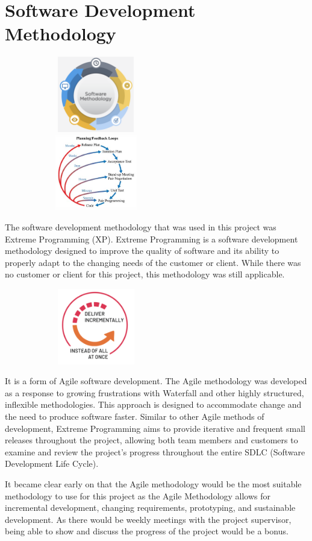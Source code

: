 \section{Software Development Methodology}
\begin{center}
    \includegraphics[width=8cm,height=3.3cm,keepaspectratio]{images/software_methodology}
    \includegraphics[width=8cm,height=3.3cm,keepaspectratio]{images/xp}
\end{center}
\par
The software development methodology that was used in this project was Extreme 
Programming (XP). Extreme Programming is a software development methodology 
designed to improve the quality of software and its ability to properly adapt to
the changing needs of the customer or client. While there was no customer or 
client for this project, this methodology was still applicable. 
\par
\medskip
\begin{center}
    \includegraphics[width=8cm,height=3.3cm,keepaspectratio]{images/agile}
\end{center}
It is a form of Agile software development. The Agile methodology was developed 
as a response to growing frustrations with Waterfall and other highly 
structured, inflexible methodologies. This approach is designed to accommodate 
change and the need to produce software faster. Similar to other Agile methods 
of development, Extreme Programming aims to provide iterative and frequent small
releases throughout the project, allowing both team members and customers to 
examine and review the project’s progress throughout the entire SDLC (Software
Development Life Cycle). 
\par
\medskip
It became clear early on that the Agile methodology would be the most suitable 
methodology to use for this project as the Agile Methodology allows for 
incremental development, changing requirements, prototyping, and sustainable 
development. As there would be weekly meetings with the project supervisor, 
being able to show and discuss the progress of the project would be a bonus. 

